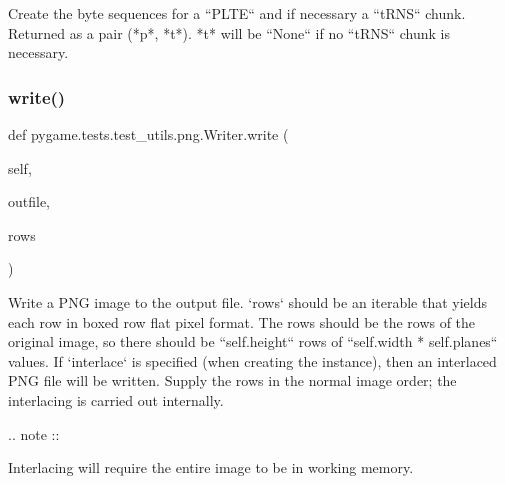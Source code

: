 \begin{DoxyVerb}Create the byte sequences for a ``PLTE`` and if necessary a
``tRNS`` chunk.  Returned as a pair (*p*, *t*).  *t* will be
``None`` if no ``tRNS`` chunk is necessary.
\end{DoxyVerb}
 \mbox{\label{classpygame_1_1tests_1_1test__utils_1_1png_1_1_writer_a30e64f6a5a3a197b27fa97896034adcb}} 
\subsubsection{\texorpdfstring{write()}{write()}}
{\footnotesize\ttfamily def pygame.\+tests.\+test\+\_\+utils.\+png.\+Writer.\+write (\begin{DoxyParamCaption}\item[{}]{self,  }\item[{}]{outfile,  }\item[{}]{rows }\end{DoxyParamCaption})}

\begin{DoxyVerb}Write a PNG image to the output file.  `rows` should be
an iterable that yields each row in boxed row flat pixel format.
The rows should be the rows of the original image, so there
should be ``self.height`` rows of ``self.width * self.planes`` values.
If `interlace` is specified (when creating the instance), then
an interlaced PNG file will be written.  Supply the rows in the
normal image order; the interlacing is carried out internally.

.. note ::

  Interlacing will require the entire image to be in working memory.
\end{DoxyVerb}
 \mbox{\label{classpygame_1_1tests_1_1test__utils_1_1png_1_1_writer_a537d59d4940e254553bc116271ef6cae}} 
